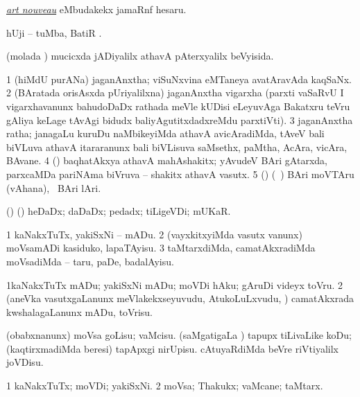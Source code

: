 \bentry
{}
\gl{\nA}
\expl{\G\ }
\bmng
\hyperref{kandict_a.pdf}{A}{art nouveau}{\it art nouveau} eMbudakekx jamaRnf hesaru. 
\emng
\eentry

\bentry
{}
\gl{\nA}
\bmng
hUji -- tuMba, BatiR 
\emng
. \eentry

\bentry
{}
\gl{\gu}
\bmng
(molada \vi) mucicxda jADiyalilx athavA pAterxyalilx beVyisida. 
\emng
\eentry

\bentry
{}
\gl{\nA}
\bmng
\bnum
\num{1} (hiMdU purANa) jaganAnxtha; viSuNxvina eMTaneya avatAravAda kaqSaNx. 
\num{2} (BAratada orisAsxda pUriyalilxna) jaganAnxtha vigarxha (parxti vaSaRvU I vigarxhavanunx bahudoDaDx rathada meVle kUDisi eLeyuvAga Bakatxru teVru gAliya keLage tAvAgi bidudx baliyAgutitxdadxreMdu parxtiVti). 
\num{3} jaganAnxtha ratha; janagaLu kuruDu naMbikeyiMda athavA avicAradiMda, tAveV bali biVLuva athavA itararanunx bali biVLisuva saMsethx, paMtha, AcAra, vicAra, BAvane. 
\num{4} () baqhatAkxya athavA mahAshakitx; yAvudeV BAri gAtarxda, parxcaMDa pariNAma biVruva -- shakitx athavA vasutx. 
\num{5} () (\kanmu\ \birx) BAri moVTAru (vAhana), \kanmu\ BAri lAri. 
\enum
\emng
\eentry

\bentry
{}
\gl{\nA}
\bmng
(\birx) (\ashi) heDaDx; daDaDx; pedadx; tiLigeVDi; mUKaR. 
\emng
\eentry

\bentry
{}
\gl{\sakirx}
\bmng
\bnum
\num{1} kaNakxTuTx, yakiSxNi -- mADu. 
\num{2} (vayxkitxyiMda vasutx \mo vanunx) moVsamADi kasiduko, lapaTAyisu. 
\num{3} taMtarxdiMda, camatAkxradiMda moVsadiMda -- taru, paDe, badalAyisu. 
\enum
\emng

\noindent
\gl{\akirx}
\bmng
\bnum
\num{1}kaNakxTuTx mADu; yakiSxNi mADu; moVDi hAku; gAruDi videyx toVru. 
\num{2} (aneVka vasutxgaLanunx meVlakekxseyuvudu, AtukoLuLxvudu, \mo) camatAkxrada kwshalagaLanunx mADu, toVrisu. 
\enum
\emng

\noindent
\gl{\pagu}
\bmng
{} 
\banum
{} (obabxnanunx) moVsa goLisu; vaMcisu. 
 (saMgatigaLa \vi) tapupx tiLivaLike koDu; (kaqtirxmadiMda beresi) tapApxgi nirUpisu. 
 cAtuyaRdiMda beVre riVtiyalilx joVDisu. 
\eanum
\emng
\eentry

\bentry
{}
\gl{\nA}
\bmng
\bnum
\num{1} kaNakxTuTx; moVDi; yakiSxNi. 
\num{2} moVsa; Thakukx; vaMcane; taMtarx. 
\enum
\emng
\eentry

